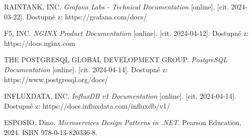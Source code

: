 \documentclass[a4paper,12pt]{article}
\begin{document}
{%
RAINTANK, INC. \emph{Grafana Labs - Technical Documentation} [online]. [cit. 2024-03-22]. Dostupné z: https://grafana.com/docs/

 F5, INC. \emph{NGINX Product Documentation} [online]. [cit. 2024-04-12]. Dostupné z: https://docs.nginx.com

THE POSTGRESQL GLOBAL DEVELOPMENT GROUP. \emph{PostgreSQL Documentation} [online]. [cit. 2024-04-14]. Dostupné z: https://www.postgresql.org/docs/

INFLUXDATA, INC. \emph{InfluxDB v1 Documentation} [online]. [cit. 2024-04-14]. Dostupné z: https://docs.influxdata.com/influxdb/v1/

ESPOSIO, Dino. \emph{Microservices Design Patterns in .NET}. Pearson Education, 2024. ISBN 978-0-13-820336-8.


}





\seznamobr  %


\seznamtab  %




\end{document}
